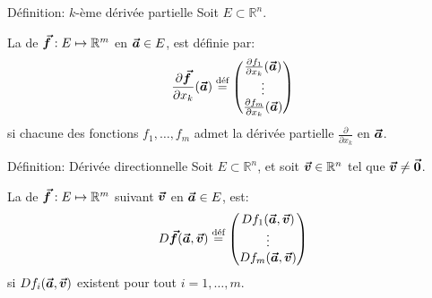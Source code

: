 \documentclass[a4paper]{article}
\begin{document}
\begin{parag}{Définition: $k$-ème dérivée partielle}
    Soit $E \subset \mathbb{R}^n$.

    La  de $\bm{\protect\vec{f}}: E \mapsto \mathbb{R}^m$ en $\bm{\protect\vec{a}} \in E$, est définie par: 
    \[\frac{\partial \bvec{f}}{\partial x_k}\left(\bvec{a}\right) \over{=}{déf} \begin{pmatrix} \frac{\partial f_1}{\partial x_k}\left(\bvec{a}\right) \\ \vdots \\ \frac{\partial f_m}{\partial x_k}\left(\bvec{a}\right) \end{pmatrix}\]
    si chacune des fonctions $f_1, \ldots, f_m$ admet la dérivée partielle $\frac{\partial}{\partial x_k}$ en $\bm{\protect\vec{a}}$.
\end{parag}

\begin{parag}{Définition: Dérivée directionnelle}
    Soit $E \subset \mathbb{R}^n$, et soit $\bm{\protect\vec{v}} \in \mathbb{R}^n$ tel que $\bm{\protect\vec{v}} \neq \bm{\protect\vec{0}}$. 

    La  de $\bm{\protect\vec{f}}: E \mapsto \mathbb{R}^m$ suivant $\bm{\protect\vec{v}}$ en $\bm{\protect\vec{a}} \in E$, est: 
    \[D \bvec{f}\left(\bvec{a}, \bvec{v}\right) \over{=}{déf} \begin{pmatrix} Df_1\left(\bvec{a}, \bvec{v}\right) \\ \vdots \\ Df_m\left(\bvec{a}, \bvec{v}\right) \end{pmatrix}\]
    si $Df_i\left(\bvec{a}, \bvec{v}\right)$ existent pour tout $i = 1, \ldots, m$.
\end{parag}
\end{document}
